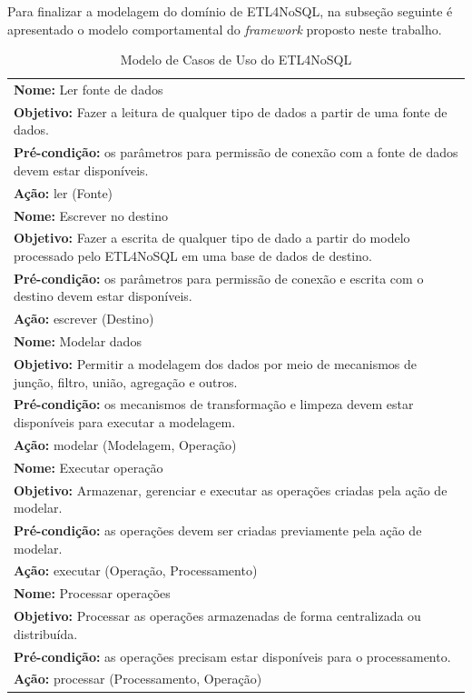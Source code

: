 Para finalizar a modelagem do domínio de ETL4NoSQL, na subseção seguinte é apresentado o modelo comportamental do \textit{framework} proposto neste trabalho.



\begin{table}[h!]
	\centering
	\caption{Modelo de Casos de Uso do ETL4NoSQL}
	\label{casosdeuso}
	\begin{tabular}{|p{14cm}|}
		\hline
			\textbf{Nome:} Ler fonte de dados\\ 
			\textbf{Objetivo:} Fazer a leitura de qualquer tipo de dados a partir de uma fonte de dados.\\ 
			\textbf{Pré-condição:} os parâmetros para permissão de conexão com a fonte de dados devem estar disponíveis.\\ 
			\textbf{Ação:} ler (Fonte)\\ 
		\hline
			\textbf{Nome:} Escrever no destino\\ 
			\textbf{Objetivo:} Fazer a escrita de qualquer tipo de dado a partir do modelo processado pelo ETL4NoSQL em uma base  de dados de destino.\\ 
			\textbf{Pré-condição:} os parâmetros para permissão de conexão e escrita com o destino devem estar disponíveis.\\ 
			\textbf{Ação:} escrever (Destino)  \\ 
	\hline
			\textbf{Nome:} Modelar dados\\ 
			\textbf{Objetivo:} Permitir a modelagem dos dados por meio de mecanismos de junção, filtro, união, agregação e outros. \\
			 \textbf{Pré-condição:} os mecanismos de transformação e limpeza devem estar disponíveis para executar a modelagem.\\ 
			 \textbf{Ação:} modelar (Modelagem, Operação)\\ 
	 \hline
	 		\textbf{Nome:} Executar operação\\ 
	 		\textbf{Objetivo:} Armazenar, gerenciar e executar as operações criadas pela ação de modelar.\\
	 		\textbf{Pré-condição:} as operações devem ser criadas previamente pela ação de modelar.\\ 
	 		\textbf{Ação:} executar (Operação, Processamento)\\ 
	 \hline
	 	\textbf{Nome:} Processar operações\\ 
	 	\textbf{Objetivo:} Processar as operações armazenadas de forma centralizada ou distribuída.\\
	 	\textbf{Pré-condição:} as operações precisam estar disponíveis para o processamento.\\ 
	 	\textbf{Ação:} processar (Processamento, Operação)\\ 
	 \hline
	 
	\end{tabular}
\end{table}

